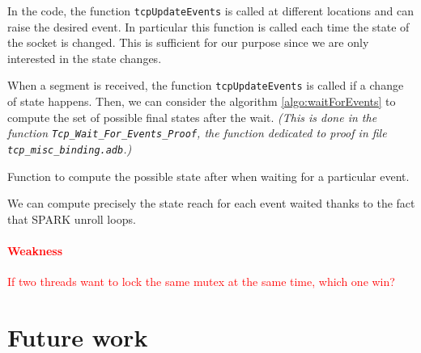 \documentclass[a4paper, 10pt]{article}
\begin{document}
    In the code, the function \lstinline[language=C]{tcpUpdateEvents} is called at different locations
    and can raise the desired event. In particular this function is called each time the state of
    the socket is changed. This is sufficient for our purpose since we are only interested in the state
    changes.

    When a segment is received, the function \lstinline[language=C]{tcpUpdateEvents} is called if a
    change of state happens. Then, we can consider the algorithm \ref{algo:waitForEvents} to compute the set of possible
    final states after the wait. \textit{(This is done in the function \lstinline[language=Ada]{Tcp_Wait_For_Events_Proof},
    the function dedicated to proof in file \texttt{tcp\_misc\_binding.adb}.)}

    \begin{algorithm}[t]
        \caption{Function to compute the possible state after when waiting for a particular event.}
        \label{algo:waitForEvents}
    \end{algorithm}

    We can compute precisely the state reach for each event waited thanks to the fact that SPARK
    unroll loops.

    \textcolor{red}{\paragraph{Weakness} If two threads want to lock the same mutex at the same time, which one win?}


    \section{Future work}

    
\end{document}
